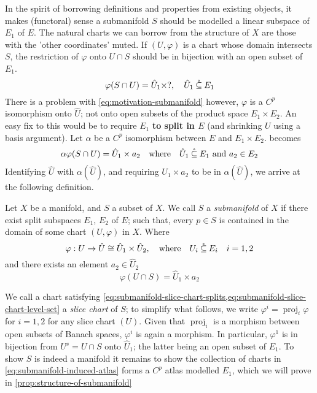 \documentclass[../main-manifolds.tex]{subfiles}
\begin{document}
In the spirit of borrowing definitions and properties from existing objects, it makes (functoral) sense a submanifold $S$ should be modelled a linear subspace of $E_1$ of $E$. The natural charts we can borrow from the structure of $X$ are those with the 'other coordinates' muted. If $(U,\varphi)$ is a chart whose domain intersects $S$, the restriction of $\varphi$ onto $U\cap S$ should be in bijection with an open subset of $E_1$. 
\begin{equation}\label{eq:motivation-submanifold}
    \varphi(S\cap U) = \hat{U}_1\times ?,\quad \hat{U}_1\:\mathring{\subseteq}\: E_1
\end{equation}
There is a problem with \cref{eq:motivation-submanifold} however, $\varphi$ is a $C^p$ isomorphism onto $\hat{U}$; not onto open subsets of the product space $E_1\times E_2$. An easy fix to this would be to require $E_1$ \textbf{to split in $E$} (and shrinking $U$ using a basis argument). Let $\alpha$ be a $C^p$ isomorphism between $E$ and $E_1\times E_2$.  becomes
\begin{equation}\label{eq:motivation-submanifold-modified}
    \alpha\varphi(S\cap U) = \hat{U}_1\times a_2\qqtext{where} \hat{U}_1\osub E_1 \text{ and }a_2\in E_2
\end{equation}
Identifying $\hat{U}$ with $\alpha(\hat{U})$, and requiring $U_1\times a_2$ to be in $\alpha(\hat{U})$, we arrive at the following definition.
\begin{definition}[Submanifold]
    Let $X$ be a manifold, and $S$ a subset of $X$. We call $S$ a \emph{submanifold} of $X$ if there exist split subspaces $E_1$, $E_2$ of $E$; such that, every $p\in S$ is contained in the domain of some chart $(U,\varphi)$ in $X$. Where
    \begin{equation}\label{eq:submanifold-slice-chart-splits}
        \varphi: U\to \hat{U}\cong \hat{U}_1\times \hat{U}_2,\qqtext{where} U_i\osub E_i\quad i=1,2
    \end{equation}
    and there exists an element $a_2\in \hat{U}_2$
    \begin{equation}\label{eq:submanifold-slice-chart-level-set}
        \varphi(U\cap S) = \hat{U}_1\times a_2
    \end{equation}
\end{definition}
We call a chart satisfying \cref{eq:submanifold-slice-chart-splits,eq:submanifold-slice-chart-level-set} a \emph{slice chart} of $S$; to simplify what follows, we write $\varphi^i = \operatorname{proj}_i\varphi$ for $i = 1,2$ for any slice chart $(U)$. Given that $\operatorname{proj}_i$ is a morphism between open subsets of Banach spaces, $\varphi^i$ is again a morphism. In particular, $\varphi^1$ is in bijection from $U^s=U\cap S$ onto $\hat{U}_1$; the latter being an open subset of $E_1$. To show $S$ is indeed a manifold it remains to show the collection of charts in \cref{eq:submanifold-induced-atlas} forms a $C^p$ atlas modelled $E_1$, which we will prove in \cref{prop:structure-of-submanifold}
\end{document}
